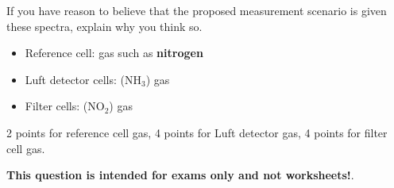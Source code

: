 \vskip 10pt

If you have reason to believe that the proposed measurement scenario is  given these spectra, explain why you think so.








\begin{itemize}
\item{} Reference cell:  gas such as {\bf nitrogen}
\vskip 5pt
\item{} Luft detector cells:  (NH$_{3}$) gas
\vskip 5pt
\item{} Filter cells:  (NO$_{2}$) gas
\end{itemize}

2 points for reference cell gas, 4 points for Luft detector gas, 4 points for filter cell gas.







{\bf This question is intended for exams only and not worksheets!}.



